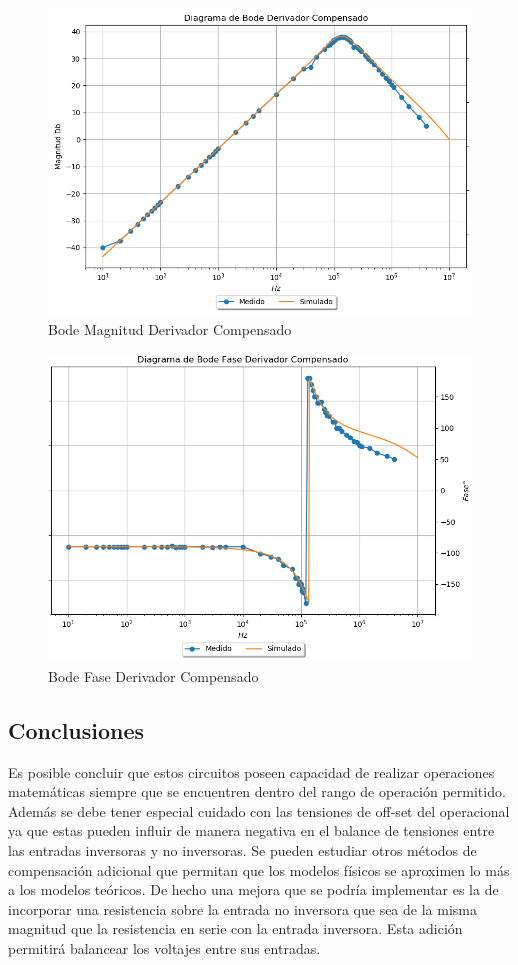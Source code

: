 \begin{figure}[H]
	\centering
	\includegraphics[width=\textwidth]{Ejercicio4/SUPERPOSICION-BODE-DERIVADOR-COMPENSADO} 
	\caption{Bode Magnitud Derivador Compensado}
\end{figure}

\begin{figure}[H]
	\centering
	\includegraphics[width=\textwidth]{Ejercicio4/SUPERPOSICION-FASE-DERIVADOR-COMPENSADO} 
	\caption{Bode Fase Derivador Compensado}
\end{figure}

\subsection{Conclusiones}
Es posible concluir que estos circuitos poseen capacidad de realizar operaciones matemáticas siempre que se encuentren dentro del rango de operación permitido. 
Además se debe tener especial cuidado con las tensiones de off-set del operacional ya que estas pueden influir de manera negativa en el balance de tensiones entre las entradas inversoras y no inversoras. Se pueden estudiar otros métodos de compensación adicional que permitan que los modelos físicos se aproximen lo más a los modelos teóricos. De hecho una mejora que se podría implementar es la de incorporar una resistencia sobre la entrada no inversora que sea de la misma magnitud que la resistencia en serie con la entrada inversora. Esta adición permitirá balancear los voltajes entre sus entradas.   
